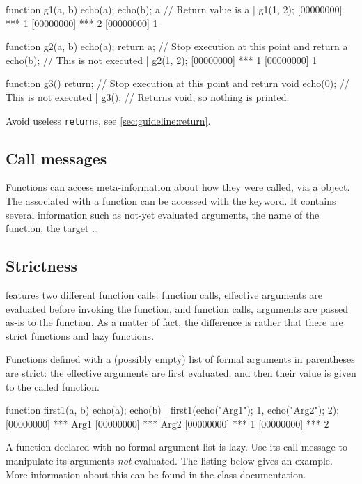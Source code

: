 \begin{urbiscript}
function g1(a, b)
{
  echo(a);
  echo(b);
  a // Return value is a
}|
g1(1, 2);
[00000000] *** 1
[00000000] *** 2
[00000000] 1

function g2(a, b)
{
  echo(a);
  return a; // Stop execution at this point and return a
  echo(b); // This is not executed
}|
g2(1, 2);
[00000000] *** 1
[00000000] 1

function g3()
{
  return; // Stop execution at this point and return void
  echo(0); // This is not executed
}|
g3(); // Returns void, so nothing is printed.
\end{urbiscript}

Avoid useless \lstinline{return}s, see \autoref{sec:guideline:return}.

\subsection{Call messages}
\label{sec:lang:call}

Functions can access meta-information about how they were called, via a
 object. The  associated with a
function can be accessed with the  keyword. It contains
several information such as not-yet evaluated arguments, the name of the
function, the target \ldots

\subsection{Strictness}

\us features two different function calls: 
function calls, effective arguments are evaluated before invoking the
function, and  function calls, arguments are passed
as-is to the function.  As a matter of fact, the difference is rather that
there are strict functions and lazy functions.

Functions defined with a (possibly empty) list of formal arguments in
parentheses are strict: the effective arguments are first evaluated,
and then their value is given to the called function.

\begin{urbiscript}
function first1(a, b) {
  echo(a); echo(b)
}|
first1({echo("Arg1"); 1},
       {echo("Arg2"); 2});
[00000000] *** Arg1
[00000000] *** Arg2
[00000000] *** 1
[00000000] *** 2
\end{urbiscript}

A function declared with no formal argument list is lazy.  Use its call
message to manipulate its arguments \emph{not} evaluated.  The listing below
gives an example.  More information about this can be found in the
 class documentation.

